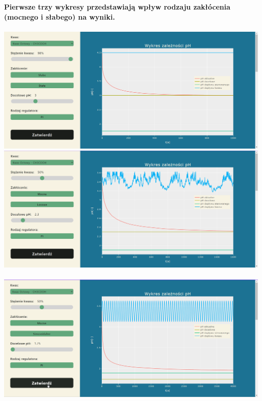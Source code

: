 \documentclass[polish,polish,a4paper,12pt]{article}
\begin{document}
	\begin{center}
		\textbf{Pierwsze trzy wykresy przedstawiają wpływ rodzaju zakłócenia (mocnego i słabego) na wyniki.}\\
		\hspace{0em}\\
		\includegraphics[scale=0.4]{octowy_98_3}\\
		\includegraphics[scale=0.4]{octowy_50_2_3_losowe}\\
		\hspace{0em}\\
		\includegraphics[scale=0.4]{octowy_50_1_75}
	\end{center}
	\newpage
\end{document}
